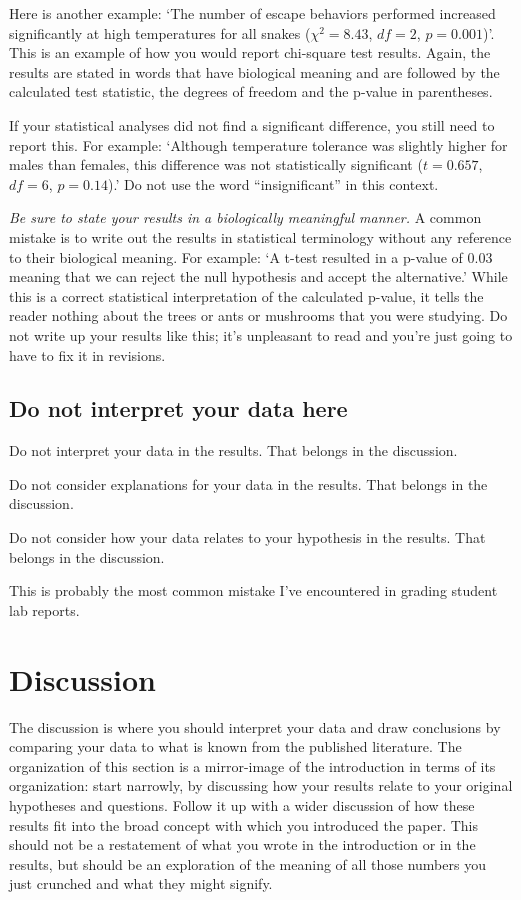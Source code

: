 \documentclass[]{book}
\begin{document}
Here is another example: `The number of escape behaviors performed
increased significantly at high temperatures for all snakes
(\(\chi^2 = 8.43\), \(df = 2\), \(p = 0.001\))'. This is an example of
how you would report chi-square test results. Again, the results are
stated in words that have biological meaning and are followed by the
calculated test statistic, the degrees of freedom and the p-value in
parentheses.

If your statistical analyses did not find a significant difference, you
still need to report this. For example: `Although temperature tolerance
was slightly higher for males than females, this difference was not
statistically significant (\(t = 0.657\), \(df = 6\), \(p = 0.14\)).' Do
not use the word ``insignificant'' in this context.

\emph{Be sure to state your results in a biologically meaningful
manner.} A common mistake is to write out the results in statistical
terminology without any reference to their biological meaning. For
example: `A t-test resulted in a p-value of 0.03 meaning that we can
reject the null hypothesis and accept the alternative.' While this is a
correct statistical interpretation of the calculated p-value, it tells
the reader nothing about the trees or ants or mushrooms that you were
studying. Do not write up your results like this; it's unpleasant to
read and you're just going to have to fix it in revisions.

\subsection{Do not interpret your data
here}\label{do-not-interpret-your-data-here}

Do not interpret your data in the results. That belongs in the
discussion.

Do not consider explanations for your data in the results. That belongs
in the discussion.

Do not consider how your data relates to your hypothesis in the results.
That belongs in the discussion.

This is probably the most common mistake I've encountered in grading
student lab reports.

\section{Discussion}\label{discussion}

The discussion is where you should interpret your data and draw
conclusions by comparing your data to what is known from the published
literature. The organization of this section is a mirror-image of the
introduction in terms of its organization: start narrowly, by discussing
how your results relate to your original hypotheses and questions.
Follow it up with a wider discussion of how these results fit into the
broad concept with which you introduced the paper. This should not be a
restatement of what you wrote in the introduction or in the results, but
should be an exploration of the meaning of all those numbers you just
crunched and what they might signify.
\end{document}
